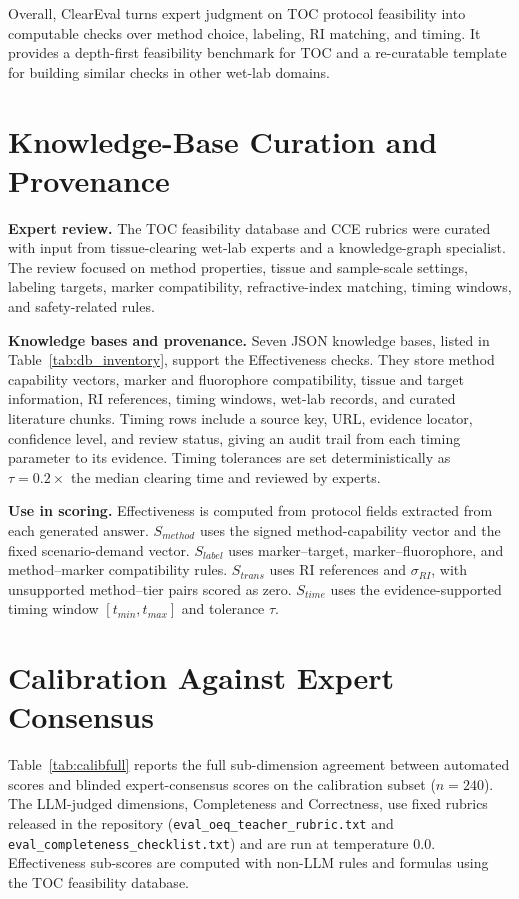 \documentclass[conference]{IEEEtran}
\begin{document}
Overall, ClearEval turns expert judgment on TOC protocol feasibility into
computable checks over method choice, labeling, RI matching, and timing. It
provides a depth-first feasibility benchmark for TOC and a re-curatable template
for building similar checks in other wet-lab domains.

\appendices
\section{Knowledge-Base Curation and Provenance}\label{app:curation}

\noindent\textbf{Expert review.}
The TOC feasibility database and CCE rubrics were curated with input from
tissue-clearing wet-lab experts and a knowledge-graph specialist. The review
focused on method properties, tissue and sample-scale settings, labeling
targets, marker compatibility, refractive-index matching, timing windows, and
safety-related rules.

\noindent\textbf{Knowledge bases and provenance.}
Seven JSON knowledge bases, listed in Table~\ref{tab:db_inventory}, support the
Effectiveness checks. They store method capability vectors, marker and
fluorophore compatibility, tissue and target information, RI references, timing
windows, wet-lab records, and curated literature chunks. Timing rows include a
source key, URL, evidence locator, confidence level, and review status, giving
an audit trail from each timing parameter to its evidence. Timing tolerances are
set deterministically as $\tau=0.2\times$ the median clearing time and reviewed
by experts.

\noindent\textbf{Use in scoring.}
Effectiveness is computed from protocol fields extracted from each generated
answer. $S_{method}$ uses the signed method-capability vector and the fixed
scenario-demand vector. $S_{label}$ uses marker--target, marker--fluorophore,
and method--marker compatibility rules. $S_{trans}$ uses RI references and
$\sigma_{RI}$, with unsupported method--tier pairs scored as zero. $S_{time}$
uses the evidence-supported timing window $[t_{min},t_{max}]$ and tolerance
$\tau$.

\section{Calibration Against Expert Consensus}\label{app:judge}

Table~\ref{tab:calibfull} reports the full sub-dimension agreement between
automated scores and blinded expert-consensus scores on the calibration subset
($n=240$). The LLM-judged dimensions, Completeness and Correctness, use fixed
rubrics released in the repository
(\texttt{eval\_oeq\_teacher\_rubric.txt} and
\texttt{eval\_completeness\_checklist.txt}) and are run at temperature $0.0$.
Effectiveness sub-scores are computed with non-LLM rules and formulas using the
TOC feasibility database.
\end{document}
